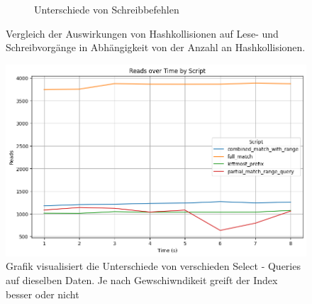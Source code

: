 \begin{figure}[!ht]
\begin{subfigure}[t]{0.48\textwidth}
        \caption[Hash - Kollisionen - Writes - Ergebnis]{Unterschiede von Schreibbefehlen}
        \label{hash-collision-writes}
    \end{subfigure}
    \caption[Hash-Kollisionen: Reads und Writes]{Vergleich der Auswirkungen von Hashkollisionen auf Lese- und Schreibvorgänge in Abhängigkeit von der Anzahl an Hashkollisionen.}
    \label{fig:hash-collision-comparison}
\end{figure}

\begin{figure}[!ht]
    \centering
    \includegraphics[width=.8\textwidth]{PNGs/Script/Index/Hash/hash-query-differences/Reads}
    \caption[Hash - Selects - Ergebnis]{Grafik visualisiert die Unterschiede von verschieden Select - Queries auf dieselben Daten. Je nach Gewschiwndikeit greift der Index besser oder nicht }
    \label{fig:hash-query-reads}
\end{figure}